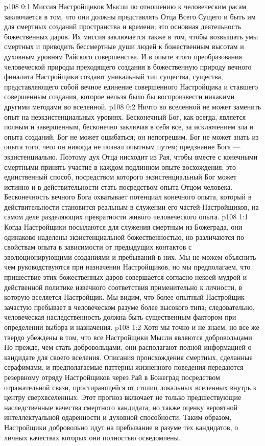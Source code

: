 \author{Одиночный Вестник}
\vs p108 0:1 Миссия Настройщиков Мысли по отношению к человеческим расам заключается в том, что они должны представлять Отца Всего Сущего и быть им для смертных созданий пространства и времени; это основная деятельность божественных даров. Их миссия заключается также в том, чтобы возвышать умы смертных и приводить бессмертные души людей к божественным высотам и духовным уровням Райского совершенства. И в опыте этого преобразования человеческой природы преходящего создания в божественную природу вечного финалита Настройщики создают уникальный тип существа, существа, представляющего собой вечное единение совершенного Настройщика и ставшего совершенным создания, которое нельзя было бы воспроизвести никакими другими методами во вселенной.
\vs p108 0:2 \pc Ничто во вселенной не может заменить опыт на неэкзистенциальных уровнях. Бесконечный Бог, как всегда, является полным и завершенным, бесконечно заключая в себя все, за исключением зла и опыта созданий. Бог не может ошибаться; он непогрешим. Бог не может знать из опыта того, чего он никогда не познал опытным путем; предзнание Бога --- экзистенциально. Поэтому дух Отца нисходит из Рая, чтобы вместе с конечными смертными принять участие в каждом подлинном опыте восхождения; это единственный способ, посредством которого экзистенциальный Бог может истинно и в действительности стать посредством опыта Отцом человека. Бесконечность вечного Бога охватывает потенциал конечного опыта, который в действительности становится реальным в служении его частей\hyp{}Настройщиков, на самом деле разделяющих превратности живого человеческого опыта.
\vs p108 1:1 Когда Настройщики посылаются для служения смертным из Божеграда, они одинаково наделены экзистенциальной божественностью, но различаются по свойствам опыта в зависимости от предыдущих контактов с эволюционирующими созданиями и пребываний в них. Мы не можем объяснить чем руководствуются при назначении Настройщиков, но мы предполагаем, что пришествие этих божественных даров совершается согласно некоей мудрой и действенной политике извечного соответствия применительно к личности, в которую вселяется Настройщик. Мы видим, что более опытный Настройщик зачастую пребывает в человеческом разуме более высокого типа; следовательно, человеческая наследственность должна быть существенным фактором при определении выбора и назначения.
\vs p108 1:2 Хотя мы точно и не знаем, но все же твердо убеждены в том, что все Настройщики Мысли являются добровольцами. Но прежде, чем стать добровольцами, они располагают полной информацией о кандидате для своего вселения. Описания происхождения смертных, сделанные серафимами, и предполагаемые паттерны жизненного поведения передаются резервному отряду Настройщиков через Рай в Божеград посредством отражательной связи, простирающейся от столиц локальных вселенных внутрь к центру сверхвселенных. Этот прогноз включает не только предшествующие наследственные качества смертного кандидата, но также оценку вероятной интеллектуальной одаренности и духовной способности. Таким образом, Настройщики добровольно идут на пребывание в разуме тех кандидатов, о личных качествах которых они полностью осведомлены.
